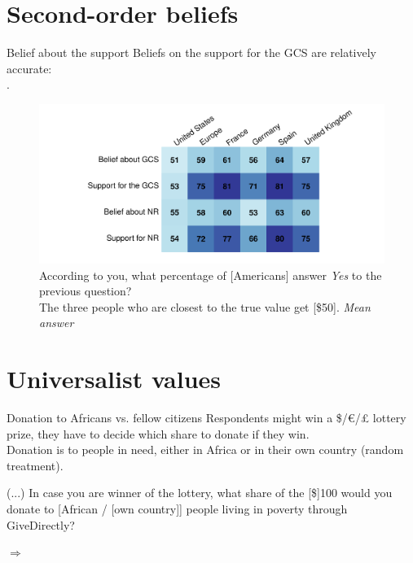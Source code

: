 \begin{framefont}{\small}
\section{Second-order beliefs}

\begin{frame}{Belief about the support\label{}}
	\bbvs \ip Beliefs on the support for the GCS are relatively accurate: \\ .
    \ee \vspace*{-.4cm}
    \begin{figure}
        \centering 
        \caption{According to you, what percentage of [Americans] answer \textit{Yes} to the previous question? \\ The three people who are closest to the true value get [\$50].  \textit{Mean answer}
        }
        \vspace{-.2cm}
        \includegraphics[height=.68\textheight]{../figures/country_comparison/belief_all_mean.pdf} 
    \end{figure}
\end{frame}

\section{Universalist values}

\begin{frame}{Donation to Africans vs. fellow citizens\label{}}
	\bbvs \ip Respondents might win a \$/\euro{}/£ lottery prize, they have to decide which share to donate if they win. \\ Donation is to people in need, either in Africa or in their own country (random treatment).
    \ee \pause
    \begin{table}[h]\label{tab:donation}\vspace*{-.35cm}
        \caption{(...) In case you are winner of the lottery, what share of the [\$]100 would you donate to [African / [own country]] people living in poverty through GiveDirectly?} 
        \makebox[\textwidth][c]{}
      \end{table}
      $\Rightarrow$ 
\end{frame}


\end{framefont}
